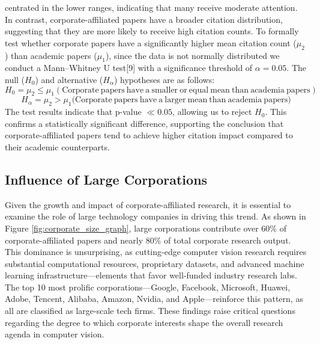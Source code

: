 \documentclass{article}
\begin{document}
centrated in the lower ranges, indicating that many receive moderate attention. In contrast, corporate-affiliated papers have a broader citation distribution, suggesting that they are more likely to receive high citation counts. To formally test whether corporate papers have a significantly higher mean citation count ($\mu_2$) than academic papers ($\mu_1$), since the data is not normally distributed we conduct a Mann–Whitney U test[9] with a significance threshold of $\alpha = 0.05$. The null ($H_0$) and alternative ($H_\alpha$) hypotheses are as follows:
\[
H_0 = \mu_2 \leq \mu_1 (\mathrm{Corporate \ papers\ have \ a \ smaller \ or \ equal \ mean \ than \ academia \ papers})
\]
\[
H_\alpha = \mu_2 > \mu_1 (\mathrm{Corporate \ papers\ have \ a \ larger \ mean\ than \ academia \ papers)}
\]
The test results indicate that p-value $\ll 0.05$, allowing us to reject $H_0$. This confirms a statistically significant difference, supporting the conclusion that corporate-affiliated papers tend to achieve higher citation impact compared to their academic counterparts.   
\vspace{-10pt}
\subsection{Influence of Large Corporations}
\vspace{-7pt}
Given the growth and impact of corporate-affiliated research, it is essential to examine the role of large technology companies in driving this trend. As shown in Figure \ref{fig:corporate_size_graph}, large corporations contribute over 60\% of corporate-affiliated papers and nearly 80\% of total corporate research output. This dominance is unsurprising, as cutting-edge computer vision research requires substantial computational resources, proprietary datasets, and advanced machine learning infrastructure—elements that favor well-funded industry research labs. The top 10 most prolific corporations—Google, Facebook, Microsoft, Huawei, Adobe, Tencent, Alibaba, Amazon, Nvidia, and Apple—reinforce this pattern, as all are classified as large-scale tech firms. These findings raise critical questions regarding the degree to which corporate interests shape the overall research agenda in computer vision.
\end{document}
